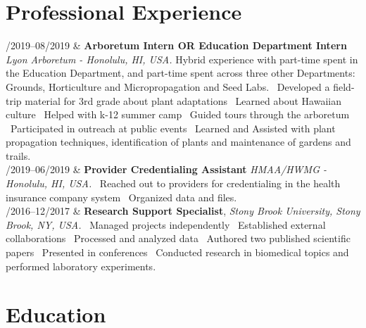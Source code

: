\documentclass[11pt, a4paper]{article}
\newcommand{\Duration}[2]{\fontsize{10pt}{0}\selectfont #1--#2}
\begin{document}
\section*{Professional Experience}

\begin{EntriesTable}
	
	\Duration{06/2019}{08/2019}  &
	\textbf{Arboretum Intern OR Education Department Intern}
	\newline
	\textit{Lyon Arboretum - Honolulu, HI, USA.}
	\newline
	Hybrid experience with part-time spent in the Education Department, and part-time spent across three other Departments: Grounds, Horticulture and Micropropagation and Seed Labs. \textbullet \ Developed a field-trip material for 3rd grade about plant adaptations \textbullet \ Learned about Hawaiian culture \textbullet \ Helped with k-12 summer camp \textbullet \ Guided tours through the arboretum \textbullet \ Participated in outreach at public events \textbullet \ Learned and Assisted with plant propagation techniques, identification of plants and maintenance of gardens and trails.
	\\
	
	\Duration{03/2019}{06/2019}  &
	\textbf{Provider Credentialing Assistant}
	\newline
	\textit{HMAA/HWMG - Honolulu, HI, USA.}
	\newline
	\textbullet \ Reached out to providers for credentialing in the health insurance company system \textbullet \ Organized data and files.
	\\
	
	\Duration{08/2016}{12/2017}  &
	\textbf{Research Support Specialist},
	\newline
	\textit{Stony Brook University, Stony Brook, NY, USA.}
	\newline   
	\textbullet \ Managed projects independently \textbullet \ Established external collaborations \textbullet \ Processed and analyzed data \textbullet \ Authored two published scientific papers \textbullet \ Presented in conferences \textbullet\ Conducted research in biomedical topics and performed laboratory experiments. 
	\\
	
\end{EntriesTable}


\section*{Education}
\end{document}
